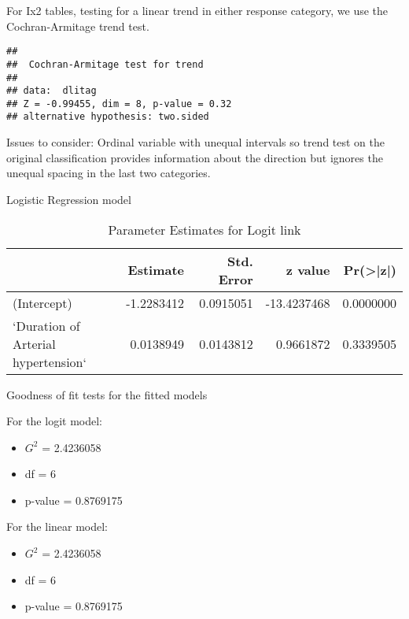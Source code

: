 \documentclass[
  ignorenonframetext,
]{beamer}
\providecommand{\tightlist}{%
  \setlength{\itemsep}{0pt}\setlength{\parskip}{0pt}}
\begin{document}
\begin{frame}[fragile]{}
\protect\hypertarget{section-1}{}

For Ix2 tables, testing for a linear trend in either response category,
we use the Cochran-Armitage trend test.

\begin{verbatim}
## 
##  Cochran-Armitage test for trend
## 
## data:  dlitag
## Z = -0.99455, dim = 8, p-value = 0.32
## alternative hypothesis: two.sided
\end{verbatim}

Issues to consider: Ordinal variable with unequal intervals so trend
test on the original classification provides information about the
direction but ignores the unequal spacing in the last two categories.

\end{frame}

\begin{frame}{Logistic Regression model}
\protect\hypertarget{logistic-regression-model}{}

\begin{table}

\caption{\label{tab:unnamed-chunk-6}Parameter Estimates for Logit link}
\centering
\begin{tabular}[t]{l|r|r|r|r}
\hline
  & Estimate & Std. Error & z value & Pr(>|z|)\\
\hline
(Intercept) & -1.2283412 & 0.0915051 & -13.4237468 & 0.0000000\\
\hline
`Duration of Arterial hypertension` & 0.0138949 & 0.0143812 & 0.9661872 & 0.3339505\\
\hline
\end{tabular}
\end{table}

\end{frame}

\begin{frame}{Goodness of fit tests for the fitted models}
\protect\hypertarget{goodness-of-fit-tests-for-the-fitted-models}{}

For the logit model:

\begin{itemize}
\tightlist
\item
  \(G^2\) = 2.4236058
\item
  df = 6
\item
  p-value = 0.8769175
\end{itemize}

For the linear model:

\begin{itemize}
\tightlist
\item
  \(G^2\) = 2.4236058
\item
  df = 6
\item
  p-value = 0.8769175
\end{itemize}

\end{frame}
\end{document}
